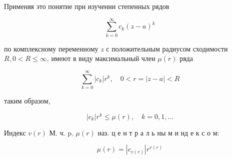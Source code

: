 \documentclass[10pt]{article}
\begin{document}
Применяя это понятие при изучении степенных рядов



\[

\sum_{k=0}^{\infty} c_{k}(z-a)^{k}

\]



по комплексному переменному $z$ с положительным радиусом сходимости $R, 0<R \leqslant \infty$, имеют в виду максимальный член $\mu(r)$ ряда



\[

\sum_{k=0}^{\infty}\left|c_{k}\right| r^{k}, \quad 0<r=|z-a|<R

\]



таким образом,



\[

\left|c_{k}\right| r^{k} \leqslant \mu(r), \quad k=0,1, \ldots

\]



Индекс $v(r)$ М. ч. p. $\mu(r)$ наз. ц е н т р а л ь ны м и нд е к с о м:



\[

\mu(r)=\left|c_{v(r)}\right| r^{v(r)}

\]
\end{document}
